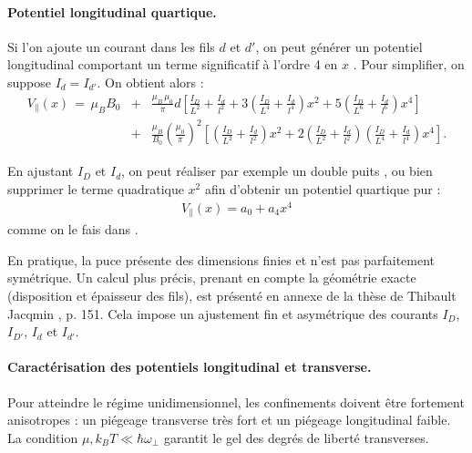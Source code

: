 \medskip


 \paragraph{Potentiel longitudinal quartique.}
Si l’on ajoute un courant dans les fils $d$ et $d'$, on peut générer un potentiel longitudinal comportant un terme significatif à l’ordre 4 en $x$ . Pour simplifier, on suppose $I_d=I_{d'}$. On obtient alors : 
 \begin{eqnarray*}
 	V_\parallel(x) \, = \, \mu_B B_0  & + & 	 \frac{\mu_B \, \mu_0}{\pi} d  \left [ \frac{I_D}{L^2} + \frac{I_d}{l^2} + 3 \left ( \frac{I_D}{L^4} + \frac{I_d}{l^4} \right ) x^2  +  5 \left ( \frac{I_D}{L^6} + \frac{I_d}{l^6} \right ) x^4 \right ] \\
 	& + & \frac{\mu_B}{B_0} \left ( \frac{\mu_0}{\pi} \right )^2  \left [ \left ( \frac{I_D}{L^2} + \frac{I_d}{l^2} \right ) x^2  + 2 \left ( \frac{I_D}{L^2} + \frac{I_d}{l^2} \right )\left ( \frac{I_D}{L^4} + \frac{I_d}{l^4} \right ) x^4 \right ].
 \end{eqnarray*}
 
 En ajustant $I_D$ et $I_d$, on peut réaliser par exemple un double puits \cite{PhysRevLett.122.090601}, ou bien supprimer le terme quadratique $x^2$ afin d’obtenir un potentiel quartique pur :
\begin{eqnarray*}
	V_\parallel(x) = a_0 + a_4 x^4 	
\end{eqnarray*}
comme on le fais dans \cite{Dubois2025}.

\medskip

En pratique, la puce présente des dimensions finies et n’est pas parfaitement symétrique. Un calcul plus précis, prenant en compte la géométrie exacte (disposition et épaisseur des fils), est présenté en annexe de la thèse de Thibault Jacqmin \cite{jacqm2012}, p. 151. Cela impose un ajustement fin et asymétrique des courants $I_D$, $I_{D'}$, $I_d$ et $I_{d'}$.

\medskip


\paragraph{Caractérisation des potentiels longitudinal et transverse.}
Pour atteindre le régime unidimensionnel, les confinements doivent être fortement anisotropes : un piégeage transverse très fort et un piégeage longitudinal faible. La condition \(\mu, k_B T \ll \hbar \omega_\perp\) garantit le gel des degrés de liberté transverses.

